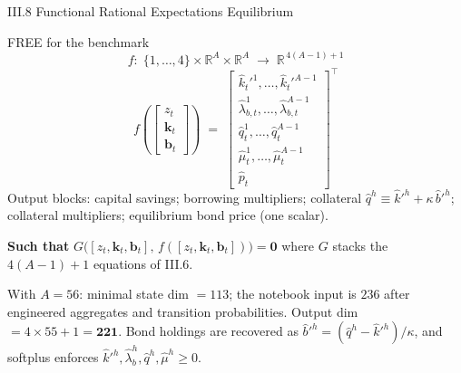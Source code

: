 \documentclass[aspectratio=169,11pt]{beamer}
\newcommand{\R}{\mathbb{R}}
\begin{document}
\begin{frame}{III.8 Functional Rational Expectations Equilibrium}
\small
\begin{exampleblock}{FREE for the benchmark}
\vspace{-3pt}
\[
f:\;\{1,\ldots,4\}\times \R^{A}\times \R^{A} \;\longrightarrow\; \R^{\,4(A-1)+1}
\]
\[
f\!\left(\!\begin{bmatrix} z_t \\ \bm{k}_t \\ \bm{b}_t \end{bmatrix}\!\right)
\;=\;
\begin{bmatrix}
\hat{k}_t'^1,\ldots,\hat{k}_t'^{A-1} \\
\hat\lambda_{b,t}^1,\ldots,\hat\lambda_{b,t}^{A-1} \\
\hat q_{t}^{1},\ldots,\hat q_{t}^{A-1} \\
\hat \mu_{t}^{1},\ldots,\hat \mu_{t}^{A-1} \\
\hat p_t
\end{bmatrix}^{\!\top}
\]
{\footnotesize Output blocks: capital savings; borrowing multipliers; collateral $\hat q^h \equiv \hat k'^h + \kappa\,\hat b'^h$; collateral multipliers; equilibrium bond price (one scalar).}
\vspace{-3pt}\end{exampleblock}

\textbf{Such that} $G\bigl([z_t, \bm{k}_t, \bm{b}_t],\,f([z_t, \bm{k}_t, \bm{b}_t])\bigr) = \bm{0}$ where $G$ stacks the $4(A-1)+1$ equations of III.6.

\vspace{0.3em}
{\footnotesize With $A = 56$: minimal state dim $=113$; the notebook input is $236$ after engineered aggregates and transition probabilities.  Output dim $=4\times55+1=\bm{221}$.  Bond holdings are recovered as $\hat b'^h=(\hat q^h-\hat k'^h)/\kappa$, and softplus enforces $\hat k'^h,\hat\lambda_b^h,\hat q^h,\hat\mu^h\ge0$.}
\end{frame}
\end{document}
